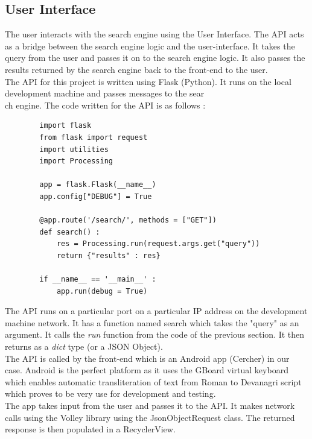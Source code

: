 \documentclass[12pt]{article}
\begin{document}
	\subsection{User Interface}
	The user interacts with the search engine using the User Interface. The API acts as a bridge between the search engine logic and the user-interface. It takes the query from the user and passes it on to the search engine logic. It also passes the results returned by the search engine back to the front-end to the user.\\
	
	The API for this project is written using Flask (Python). It runs on the local development machine and passes messages to the sear\\ch engine. The code written for the API is as follows :
	\begin{lstlisting}
		import flask
		from flask import request
		import utilities
		import Processing
		
		app = flask.Flask(__name__)
		app.config["DEBUG"] = True
		
		@app.route('/search/', methods = ["GET"])
		def search() :
			res = Processing.run(request.args.get("query"))
			return {"results" : res}
		
		if __name__ == '__main__' :
			app.run(debug = True)	
	\end{lstlisting}
	
	The API runs on a particular port on a particular IP address on the development machine network. It has a function named search which takes the "query" as an argument. It calls the \textit{run} function from the code of the previous section. It then returns as a \textit{dict} type (or a JSON Object).\\
	
	The API is called by the front-end which is an Android app (Cercher) in our case. Android is the perfect platform as it uses the GBoard virtual keyboard which enables automatic transliteration of text from Roman to Devanagri script which proves to be very use for development and testing.\\
	
	The app takes input from the user and passes it to the API. It makes network calls using the Volley library using the JsonObjectRequest class. The returned response is then populated in a RecyclerView. \\
	
\end{document}
